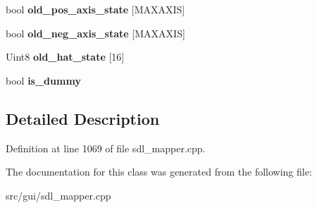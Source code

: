 \begin{DoxyCompactItemize}
\item 
\hypertarget{classCStickBindGroup_a283b8cbb49f54ad309ac461d31fcb8f3}{bool {\bfseries old\-\_\-pos\-\_\-axis\-\_\-state} \mbox{[}M\-A\-X\-A\-X\-I\-S\mbox{]}}\label{classCStickBindGroup_a283b8cbb49f54ad309ac461d31fcb8f3}

\item 
\hypertarget{classCStickBindGroup_abf4f7de4055e1e6a70016a6830a39128}{bool {\bfseries old\-\_\-neg\-\_\-axis\-\_\-state} \mbox{[}M\-A\-X\-A\-X\-I\-S\mbox{]}}\label{classCStickBindGroup_abf4f7de4055e1e6a70016a6830a39128}

\item 
\hypertarget{classCStickBindGroup_a19df3fcb72315b312752da5a66676dc3}{Uint8 {\bfseries old\-\_\-hat\-\_\-state} \mbox{[}16\mbox{]}}\label{classCStickBindGroup_a19df3fcb72315b312752da5a66676dc3}

\item 
\hypertarget{classCStickBindGroup_a23c7e557c5ce9b73c62321e8c1504abc}{bool {\bfseries is\-\_\-dummy}}\label{classCStickBindGroup_a23c7e557c5ce9b73c62321e8c1504abc}

\end{DoxyCompactItemize}


\subsection{Detailed Description}


Definition at line 1069 of file sdl\-\_\-mapper.\-cpp.



The documentation for this class was generated from the following file\-:\begin{DoxyCompactItemize}
\item 
src/gui/sdl\-\_\-mapper.\-cpp\end{DoxyCompactItemize}
